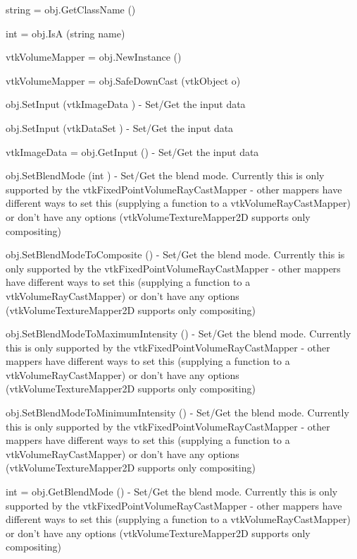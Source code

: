 \begin{DoxyItemize}
\item {\ttfamily string = obj.\-Get\-Class\-Name ()}  
\item {\ttfamily int = obj.\-Is\-A (string name)}  
\item {\ttfamily vtk\-Volume\-Mapper = obj.\-New\-Instance ()}  
\item {\ttfamily vtk\-Volume\-Mapper = obj.\-Safe\-Down\-Cast (vtk\-Object o)}  
\item {\ttfamily obj.\-Set\-Input (vtk\-Image\-Data )} -\/ Set/\-Get the input data  
\item {\ttfamily obj.\-Set\-Input (vtk\-Data\-Set )} -\/ Set/\-Get the input data  
\item {\ttfamily vtk\-Image\-Data = obj.\-Get\-Input ()} -\/ Set/\-Get the input data  
\item {\ttfamily obj.\-Set\-Blend\-Mode (int )} -\/ Set/\-Get the blend mode. Currently this is only supported by the vtk\-Fixed\-Point\-Volume\-Ray\-Cast\-Mapper -\/ other mappers have different ways to set this (supplying a function to a vtk\-Volume\-Ray\-Cast\-Mapper) or don't have any options (vtk\-Volume\-Texture\-Mapper2\-D supports only compositing)  
\item {\ttfamily obj.\-Set\-Blend\-Mode\-To\-Composite ()} -\/ Set/\-Get the blend mode. Currently this is only supported by the vtk\-Fixed\-Point\-Volume\-Ray\-Cast\-Mapper -\/ other mappers have different ways to set this (supplying a function to a vtk\-Volume\-Ray\-Cast\-Mapper) or don't have any options (vtk\-Volume\-Texture\-Mapper2\-D supports only compositing)  
\item {\ttfamily obj.\-Set\-Blend\-Mode\-To\-Maximum\-Intensity ()} -\/ Set/\-Get the blend mode. Currently this is only supported by the vtk\-Fixed\-Point\-Volume\-Ray\-Cast\-Mapper -\/ other mappers have different ways to set this (supplying a function to a vtk\-Volume\-Ray\-Cast\-Mapper) or don't have any options (vtk\-Volume\-Texture\-Mapper2\-D supports only compositing)  
\item {\ttfamily obj.\-Set\-Blend\-Mode\-To\-Minimum\-Intensity ()} -\/ Set/\-Get the blend mode. Currently this is only supported by the vtk\-Fixed\-Point\-Volume\-Ray\-Cast\-Mapper -\/ other mappers have different ways to set this (supplying a function to a vtk\-Volume\-Ray\-Cast\-Mapper) or don't have any options (vtk\-Volume\-Texture\-Mapper2\-D supports only compositing)  
\item {\ttfamily int = obj.\-Get\-Blend\-Mode ()} -\/ Set/\-Get the blend mode. Currently this is only supported by the vtk\-Fixed\-Point\-Volume\-Ray\-Cast\-Mapper -\/ other mappers have different ways to set this (supplying a function to a vtk\-Volume\-Ray\-Cast\-Mapper) or don't have any options (vtk\-Volume\-Texture\-Mapper2\-D supports only compositing)  

\end{DoxyItemize}
